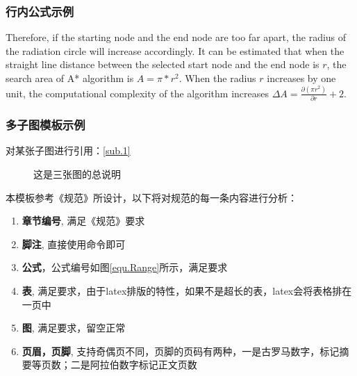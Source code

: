 \documentclass{nitthesis}
\begin{document}
\subsubsection{行内公式示例}

Therefore, if the starting node and the end node are too far apart, the radius of the radiation circle will increase accordingly. It can be estimated that when the straight line distance between the selected start node and the end node is $r$, the search area of A* algorithm is $A = \pi * r ^ 2$. When the radius $r$ increases by one unit, the computational complexity of the algorithm increases $\Delta A = \frac{{\partial (\pi {r^2})}}{{\partial r}} + 2$. 

\subsubsection{多子图模板示例}

对某张子图进行引用：\autoref{sub.1}

\begin{figure}[H]
    \caption{这是三张图的总说明}
    \label{fig.ThreeFigs}
\end{figure}


本模板参考《规范》所设计，以下将对规范的每一条内容进行分析：

\begin{enumerate}
    \item \textbf{章节编号}, 满足《规范》要求
    \item \textbf{脚注}, 直接使用命令即可
    \item \textbf{公式}，公式编号如图\ref{equ.Range}所示，满足要求
    \item \textbf{表}, 满足要求，由于latex排版的特性，如果不是超长的表，latex会将表格排在一页中
    \item \textbf{图}, 满足要求，留空正常
    \item \textbf{页眉，页脚}, 支持奇偶页不同，页脚的页码有两种，一是古罗马数字，标记摘要等页数；二是阿拉伯数字标记正文页数
\end{enumerate}
\end{document}
